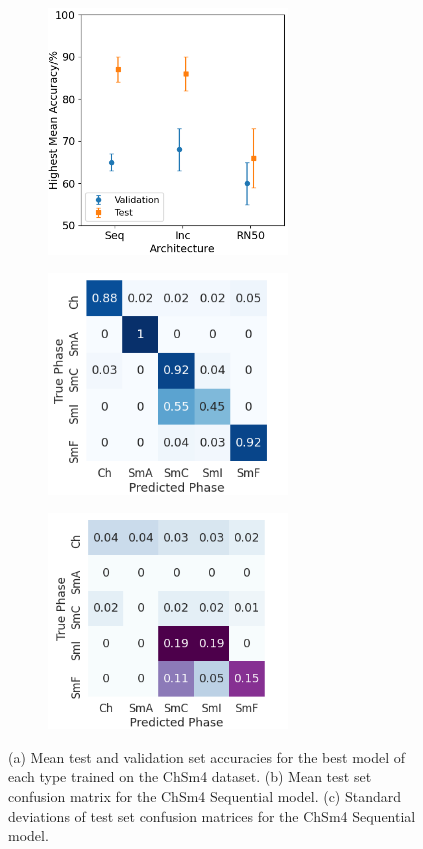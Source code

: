 \documentclass[12pt]{article}
\begin{document}
\begin{figure}[!h]
\centering
\begin{subfigure}{0.4\textwidth}
	\centering
	\includegraphics[width=2.5in]{images/Graphs/ChSm4.png}
	\caption{}
	\label{chsm4:graph}
\end{subfigure}

\begin{subfigure}{0.4\textwidth}
	\centering
	\includegraphics[width=2.5in]{images/ConMats/ChSm4_mean.png}
	\caption{}
	\label{chsm4:mean}
\end{subfigure}%
\begin{subfigure}{0.4\textwidth}
	\centering
	\includegraphics[width=2.5in]{images/ConMats/ChSm4_std.png}
	\caption{}
	\label{chsm4:std}
\end{subfigure}%
\caption{(a) Mean test and validation set accuracies for the best model of each type trained on the ChSm4 dataset. (b) Mean test set confusion matrix for the ChSm4 Sequential model. (c) Standard deviations of test set confusion matrices for the ChSm4 Sequential model.}
\label{chsm4:chsm4}
\end{figure}
\end{document}
